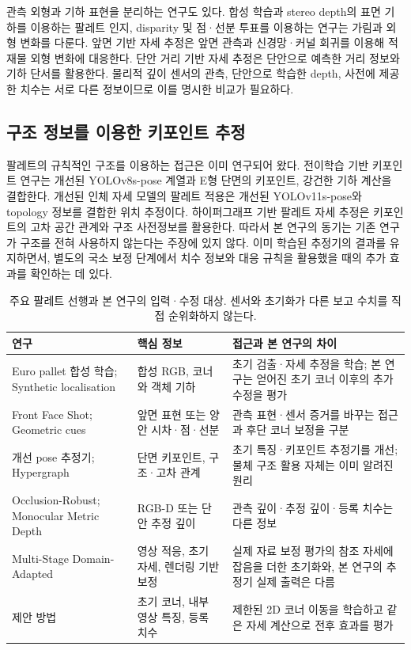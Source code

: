 관측 외형과 기하 표현을 분리하는 연구도 있다. 합성 학습과 stereo depth의 표면 기하를 이용하는 팔레트 인지\cite{beleznai2023}, disparity 및 점·선분 투표를 이용하는 연구\cite{beleznai2025}는 가림과 외형 변화를 다룬다. 앞면 기반 자세 추정은 앞면 관측과 신경망·커널 회귀를 이용해 적재물 외형 변화에 대응한다\cite{kai2025}. 단안 거리 기반 자세 추정은 단안으로 예측한 거리 정보와 기하 단서를 활용한다\cite{miura2026}. 물리적 깊이 센서의 관측, 단안으로 학습한 depth, 사전에 제공한 치수는 서로 다른 정보이므로 이를 명시한 비교가 필요하다.

\subsection{구조 정보를 이용한 키포인트 추정}
팔레트의 규칙적인 구조를 이용하는 접근은 이미 연구되어 왔다. 전이학습 기반 키포인트 연구는 개선된 YOLOv8s-pose 계열과 E형 단면의 키포인트, 강건한 기하 계산을 결합한다\cite{zhou2025jsc}. 개선된 인체 자세 모델의 팔레트 적용은 개선된 YOLOv11s-pose와 topology 정보를 결합한 위치 추정이다\cite{zhou2025nyas}. 하이퍼그래프 기반 팔레트 자세 추정은 키포인트의 고차 공간 관계와 구조 사전정보를 활용한다\cite{ye2026}. 따라서 본 연구의 동기는 기존 연구가 구조를 전혀 사용하지 않는다는 주장에 있지 않다. 이미 학습된 추정기의 결과를 유지하면서, 별도의 국소 보정 단계에서 치수 정보와 대응 규칙을 활용했을 때의 추가 효과를 확인하는 데 있다.


\begin{table}[t]
\centering\footnotesize
\caption{주요 팔레트 선행과 본 연구의 입력·수정 대상. 센서와 초기화가 다른 보고 수치를 직접 순위화하지 않는다.}\label{tab:literature}
\begin{tabularx}{\textwidth}{p{}p{}Y}
\toprule 연구 & 핵심 정보 & 접근과 본 연구의 차이 \\\midrule
Euro pallet 합성 학습\cite{knitt2022}; Synthetic localisation\cite{mueller2024} & 합성 RGB, 코너와 객체 기하 & 초기 검출·자세 추정을 학습; 본 연구는 얻어진 초기 코너 이후의 추가 수정을 평가 \\
Front Face Shot\cite{kai2025}; Geometric cues\cite{beleznai2025} & 앞면 표현 또는 양안 시차·점·선분 & 관측 표현·센서 증거를 바꾸는 접근과 후단 코너 보정을 구분 \\
개선 pose 추정기\cite{zhou2025jsc,zhou2025nyas}; Hypergraph\cite{ye2026} & 단면 키포인트, 구조·고차 관계 & 초기 특징·키포인트 추정기를 개선; 물체 구조 활용 자체는 이미 알려진 원리 \\
Occlusion-Robust\cite{vu2024}; Monocular Metric Depth\cite{miura2026} & RGB-D 또는 단안 추정 깊이 & 관측 깊이·추정 깊이·등록 치수는 다른 정보 \\
Multi-Stage Domain-Adapted\cite{elmoaqet2025} & 영상 적응, 초기 자세, 렌더링 기반 보정 & 실제 자료 보정 평가의 참조 자세에 잡음을 더한 초기화와, 본 연구의 추정기 실제 출력은 다름 \\
제안 방법 & 초기 코너, 내부 영상 특징, 등록 치수 & 제한된 2D 코너 이동을 학습하고 같은 자세 계산으로 전후 효과를 평가 \\
\bottomrule
\end{tabularx}
\end{table}


